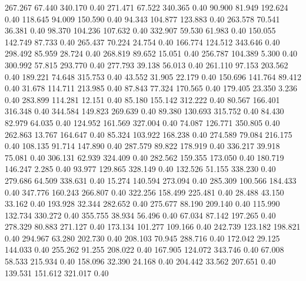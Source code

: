  267.267   67.440  340.170         0.40
 271.471   67.522  340.365         0.40
  90.900   81.949  192.624         0.40
 118.645   94.009  150.590         0.40
  94.343  104.877  123.883         0.40
 263.578   70.541   36.381         0.40
  98.370  104.236  107.632         0.40
 332.907   59.530   61.983         0.40
 150.055  142.749   87.733         0.40
 265.437   70.224   24.754         0.40
 166.774  124.512  343.646         0.40
 298.492   85.959   28.724         0.40
 268.819   89.652   15.051         0.40
 256.787  104.389    5.300         0.40
 300.992   57.815  293.770         0.40
 277.793   39.138   56.013         0.40
 261.110   97.153  203.562         0.40
 189.221   74.648  315.753         0.40
  43.552   31.905   22.179         0.40
 150.696  141.764   89.412         0.40
  31.678  114.711  213.985         0.40
  87.843   77.324  170.565         0.40
 179.405   23.350    3.236         0.40
 283.899  114.281   12.151         0.40
  85.180  155.142  312.222         0.40
  80.567  166.401  316.348         0.40
 344.584  149.823  269.639         0.40
  89.380  130.693  315.752         0.40
  84.430   82.979   64.035         0.40
 124.952  161.569  327.004         0.40
  74.087  126.771  350.805         0.40
 262.863   13.767  164.647         0.40
  85.324  103.922  168.238         0.40
 274.589   79.084  216.175         0.40
 108.135   91.714  147.890         0.40
 287.579   89.822  178.919         0.40
 336.217   39.918   75.081         0.40
 306.131   62.939  324.409         0.40
 282.562  159.355  173.050         0.40
 180.719  146.247    2.285         0.40
  93.977  129.865  328.149         0.40
 132.526   51.155  338.230         0.40
 279.686   64.509  338.631         0.40
  15.274  140.594  273.094         0.40
 285.309  100.566  184.433         0.40
 347.776  160.243  266.807         0.40
 322.256  158.499  225.481         0.40
  28.488   43.150   33.162         0.40
 193.928   32.344  282.652         0.40
 275.677   88.190  209.140         0.40
 115.990  132.734  330.272         0.40
 355.755   38.934   56.496         0.40
  67.034   87.142  197.265         0.40
 278.329   80.883  271.127         0.40
 173.134  101.277  109.166         0.40
 242.739  123.182  198.821         0.40
 294.967   63.280  202.730         0.40
 208.103   70.945  288.716         0.40
 172.042   29.125  144.033         0.40
 255.262   91.255  208.022         0.40
 167.905  124.072  343.746         0.40
  67.008   58.533  215.934         0.40
 158.096   32.390   24.168         0.40
 204.442   33.562  207.651         0.40
 139.531  151.612  321.017         0.40
